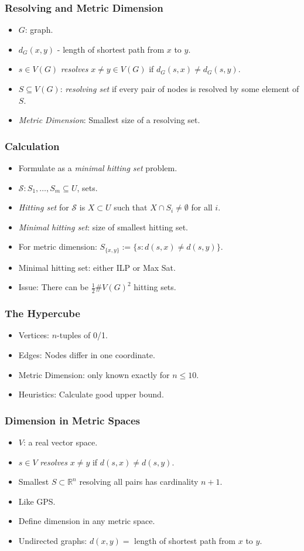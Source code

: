 \documentclass{beamer}
\newcommand{\RR}{\mathbb{R}}
\begin{document}
\begin{frame}
  \frametitle{Resolving and Metric Dimension}
  \begin{itemize}
  \item $G$: graph.
  \item $d_G(x,y)$ - length of shortest path from $x$ to $y$.
  \item $s \in V(G)$ \emph{resolves} $x \ne y \in V(G)$ if $d_G(s,x)
    \ne d_G(s,y)$.
  \item $S \subseteq V(G)$: \emph{resolving set} if every pair of
    nodes is resolved by some element of $S$.
  \item \emph{Metric Dimension}: Smallest size of a resolving set.
  \end{itemize}
\end{frame}
\begin{frame}
  \frametitle{Calculation}
  \begin{itemize}
  \item Formulate as a \emph{minimal hitting set} problem.
  \item $\mathcal{S} : S_1, \dots, S_m \subseteq U$, sets.
  \item \emph{Hitting set} for $\mathcal{S}$ is $X \subset U$
    such that $X \cap S_i \ne \emptyset$ for all $i$.
  \item \emph{Minimal hitting set}: size of smallest hitting set.
  \item For metric dimension: $S_{\{x,y\}} := \{ s : d(s,x) \ne
    d(s,y)\}$.
  \item Minimal hitting set: either ILP or Max Sat.
  \item Issue: There can be $\frac 1 2 \#V(G)^2$ hitting sets.
  \end{itemize}
\end{frame}
\begin{frame}
  \frametitle{The Hypercube}
  \begin{itemize}
  \item Vertices: $n$-tuples of 0/1.
  \item Edges: Nodes differ in one coordinate.
  \item Metric Dimension: only known exactly for $n \le 10$.
  \item Heuristics: Calculate good upper bound.
  \end{itemize}
\end{frame}
\begin{frame}
  \frametitle{Dimension in Metric Spaces}
  \begin{itemize}
  \item $V$: a real vector space.
  \item $s \in V$ \emph{resolves} $x \ne y$ if
    $d(s,x) \ne d(s,y)$.
  \item Smallest $S \subset \RR^n$ resolving all pairs
    has cardinality $n+1$.
  \item Like GPS.
  \item Define dimension in any metric space.
  \item Undirected graphs: $d(x,y)=$ length of shortest path
    from $x$ to $y$.
  \end{itemize}
\end{frame}
\end{document}

